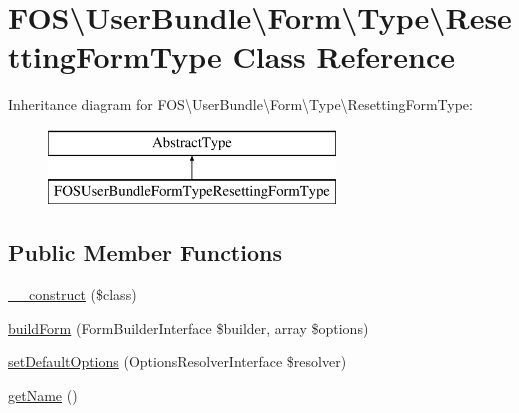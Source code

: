 \hypertarget{class_f_o_s_1_1_user_bundle_1_1_form_1_1_type_1_1_resetting_form_type}{\section{F\+O\+S\textbackslash{}User\+Bundle\textbackslash{}Form\textbackslash{}Type\textbackslash{}Resetting\+Form\+Type Class Reference}
\label{class_f_o_s_1_1_user_bundle_1_1_form_1_1_type_1_1_resetting_form_type}
}
Inheritance diagram for F\+O\+S\textbackslash{}User\+Bundle\textbackslash{}Form\textbackslash{}Type\textbackslash{}Resetting\+Form\+Type\+:\begin{figure}[H]
\begin{center}
\leavevmode
\includegraphics[height=2.000000cm]{class_f_o_s_1_1_user_bundle_1_1_form_1_1_type_1_1_resetting_form_type}
\end{center}
\end{figure}
\subsection*{Public Member Functions}
\begin{DoxyCompactItemize}
\item 
\hyperlink{class_f_o_s_1_1_user_bundle_1_1_form_1_1_type_1_1_resetting_form_type_a61d7c9bd83e2bb31ea55a8512f27ec89}{\+\_\+\+\_\+construct} (\$class)
\item 
\hyperlink{class_f_o_s_1_1_user_bundle_1_1_form_1_1_type_1_1_resetting_form_type_a87fc5cf2b169781dacfe5fd07a327a65}{build\+Form} (Form\+Builder\+Interface \$builder, array \$options)
\item 
\hyperlink{class_f_o_s_1_1_user_bundle_1_1_form_1_1_type_1_1_resetting_form_type_a596574c515c9b559490ec8681e0815e0}{set\+Default\+Options} (Options\+Resolver\+Interface \$resolver)
\item 
\hyperlink{class_f_o_s_1_1_user_bundle_1_1_form_1_1_type_1_1_resetting_form_type_a7a5bdbfb722d4d1bf92bd4a60e5c3824}{get\+Name} ()
\end{DoxyCompactItemize}


